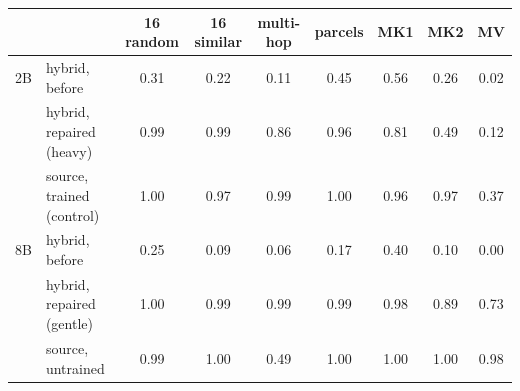 \begin{tabular}{llccccccc}
\toprule
 & & 16 random & 16 similar & multi-hop & parcels & MK1 & MK2 & MV \\
\midrule
2B & hybrid, before & 0.31 & 0.22 & 0.11 & 0.45 & 0.56 & 0.26 & 0.02 \\
   & hybrid, repaired (heavy) & 0.99 & 0.99 & 0.86 & 0.96 & 0.81 & 0.49 & 0.12 \\
   & source, trained (control) & 1.00 & 0.97 & 0.99 & 1.00 & 0.96 & 0.97 & 0.37 \\
\addlinespace
8B & hybrid, before & 0.25 & 0.09 & 0.06 & 0.17 & 0.40 & 0.10 & 0.00 \\
   & hybrid, repaired (gentle) & 1.00 & 0.99 & 0.99 & 0.99 & 0.98 & 0.89 & 0.73 \\
   & source, untrained & 0.99 & 1.00 & 0.49 & 1.00 & 1.00 & 1.00 & 0.98 \\
\bottomrule
\end{tabular}
